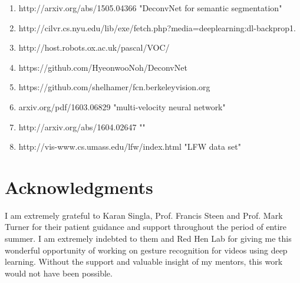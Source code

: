 \documentclass[a4paper]{article}
\begin{document}
\begin{enumerate}
	\item http://arxiv.org/abs/1505.04366 "DeconvNet for semantic segmentation"
	\item http://cilvr.cs.nyu.edu/lib/exe/fetch.php?media=deeplearning:dl-backprop1.
	\item http://host.robots.ox.ac.uk/pascal/VOC/
	\item https://github.com/HyeonwooNoh/DeconvNet
	\item https://github.com/shelhamer/fcn.berkeleyvision.org
	\item arxiv.org/pdf/1603.06829 "multi-velocity neural network"
	\item http://arxiv.org/abs/1604.02647 ""
	\item http://vis-www.cs.umass.edu/lfw/index.html "LFW data set"
\end{enumerate}

\section{Acknowledgments}

I am extremely grateful to Karan Singla, Prof. Francis Steen and Prof. Mark Turner for their patient guidance and support throughout the period of entire summer. I am extremely indebted to them and Red Hen Lab for giving me this wonderful opportunity of working on gesture recognition for videos using deep learning. Without the support and valuable insight of my mentors, this work would not have been possible.
\end{document}
